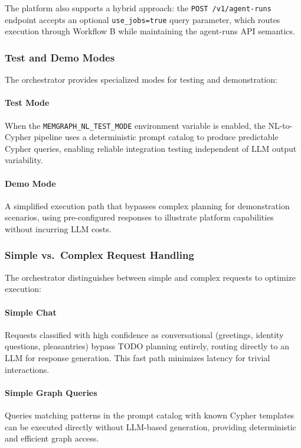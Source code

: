 The platform also supports a hybrid approach: the \texttt{POST /v1/agent-runs} endpoint accepts an optional \texttt{use\_jobs=true} query parameter, which routes execution through Workflow B while maintaining the agent-runs API semantics.

\subsubsection{Test and Demo Modes}

The orchestrator provides specialized modes for testing and demonstration:

\paragraph{Test Mode} When the \texttt{MEMGRAPH\_NL\_TEST\_MODE} environment variable is enabled, the NL-to-Cypher pipeline uses a deterministic prompt catalog to produce predictable Cypher queries, enabling reliable integration testing independent of LLM output variability.

\paragraph{Demo Mode} A simplified execution path that bypasses complex planning for demonstration scenarios, using pre-configured responses to illustrate platform capabilities without incurring LLM costs.

\subsubsection{Simple vs.\ Complex Request Handling}

The orchestrator distinguishes between simple and complex requests to optimize execution:

\paragraph{Simple Chat} Requests classified with high confidence as conversational (greetings, identity questions, pleasantries) bypass TODO planning entirely, routing directly to an LLM for response generation. This fast path minimizes latency for trivial interactions.

\paragraph{Simple Graph Queries} Queries matching patterns in the prompt catalog with known Cypher templates can be executed directly without LLM-based generation, providing deterministic and efficient graph access.

